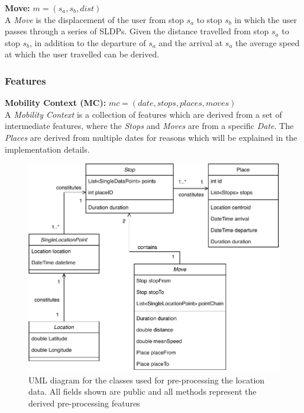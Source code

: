 \textbf{Move:} $m = (s_a, s_b, dist)$\\
A \textit{Move} is the displacement of the user from stop $s_a$ to stop $s_b$ in which the user passes through a series of SLDPs. Given the distance travelled from stop $s_a$ to stop $s_b$, in addition to the departure of $s_a$ and the arrival at $s_a$ the average speed at which the user travelled can be derived. 

\subsubsection*{Features}
\textbf{Mobility Context (MC):} $mc = (date, stops, places, moves)$\\
A \textit{Mobility Context} is a collection of features which are derived from a set of intermediate features, where the \textit{Stops} and \textit{Moves} are from a specific \textit{Date}. The \textit{Places} are derived from multiple dates for reasons which will be explained in the implementation details.

\begin{figure}
    \centering
    \includegraphics[width=\textwidth]{./images/Mobility-Preprocessing.pdf}
    \caption{UML diagram for the classes used for pre-processing the location data. All fields shown are public and all methods represent the derived pre-processing features}
    \label{fig:my_label}
\end{figure}


